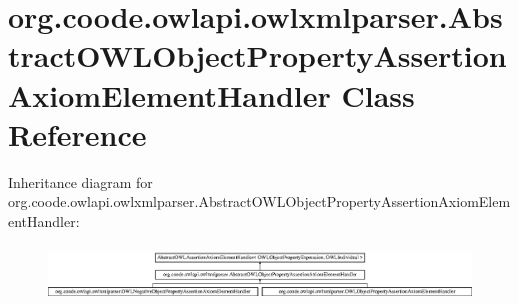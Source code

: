 \hypertarget{classorg_1_1coode_1_1owlapi_1_1owlxmlparser_1_1_abstract_o_w_l_object_property_assertion_axiom_element_handler}{\section{org.\-coode.\-owlapi.\-owlxmlparser.\-Abstract\-O\-W\-L\-Object\-Property\-Assertion\-Axiom\-Element\-Handler Class Reference}
\label{classorg_1_1coode_1_1owlapi_1_1owlxmlparser_1_1_abstract_o_w_l_object_property_assertion_axiom_element_handler}
}
Inheritance diagram for org.\-coode.\-owlapi.\-owlxmlparser.\-Abstract\-O\-W\-L\-Object\-Property\-Assertion\-Axiom\-Element\-Handler\-:\begin{figure}[H]
\begin{center}
\leavevmode
\includegraphics[height=1.494662cm]{classorg_1_1coode_1_1owlapi_1_1owlxmlparser_1_1_abstract_o_w_l_object_property_assertion_axiom_element_handler}
\end{center}
\end{figure}
